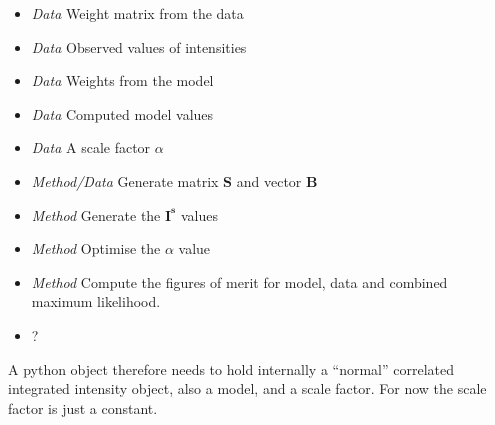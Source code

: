 \documentclass[10pt,a4paper,twoside,notitlepage]{report}
\newcommand{\mb}  [1] {\mathbf{#1}}
\begin{document}
\begin{itemize}
\item \emph{Data} Weight matrix from the data
\item \emph{Data} Observed values of intensities
\item \emph{Data} Weights from the model
\item \emph{Data} Computed model values
\item \emph{Data} A scale factor $\alpha$
\item \emph{Method/Data} Generate matrix $\mb{S}$ and vector $\mb{B}$
\item \emph{Method} Generate the $\mb{I^s}$ values
\item \emph{Method} Optimise the $\alpha$ value
\item \emph{Method} Compute the figures of merit for model, data and combined maximum likelihood.
\item ?
\end{itemize}

A python object therefore needs to hold internally a ``normal'' correlated integrated
intensity object, also a model, and a scale factor. For now the scale factor is 
just a constant.
\end{document}

